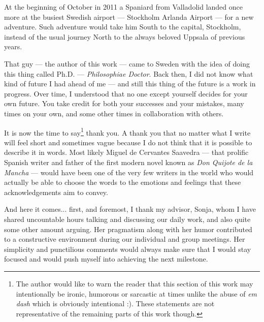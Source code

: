 

At the beginning of October in 2011 a Spaniard from Valladolid landed once more 
at the busiest Swedish airport --- Stockholm Arlanda Airport --- for a new adventure. 
Such adventure would take him South to the capital, Stockholm, instead of the usual 
journey North to the always beloved Uppsala of previous years.

That guy --- the author of this work --- came to Sweden with the idea of doing this 
thing called Ph.D. --- \emph{Philosophiae Doctor}. Back then, I did not know what 
kind of future I had ahead of me --- and still this thing of the future is a work 
in progress. Over time, I understood that no one except yourself decides for your 
own future. You take credit for both your successes and your mistakes, many times 
on your own, and some other times in collaboration with others.

It is now the time to say\footnote{The author would like to warn the reader that 
this section of this work may intentionally be ironic, humorous or sarcastic at 
times unlike the abuse of \emph{em dash} which is obviously intentional :). These 
statements are not representative of the remaining parts of this work though.} thank 
you. A thank you that no matter what I write will feel short and sometimes vague 
because I do not think that it is possible to describe it in words. Most likely 
Miguel de Cervantes Saavedra --- that prolific Spanish writer and father of the 
first modern novel known as \emph{Don Quijote de la Mancha} --- would have been 
one of the very few writers in the world who would actually be able to choose the 
words to the emotions and feelings that these acknowledgements aim to convey.

And here it comes... first, and foremost, I thank my advisor, Sonja, whom I have 
shared uncountable hours talking and discussing our daily work, and also quite some 
other amount arguing. Her pragmatism along with her humor contributed to a constructive 
environment during our individual and group meetings. Her simplicity and punctilious 
comments would always make sure that I would stay focused and would push myself 
into achieving the next milestone. 


